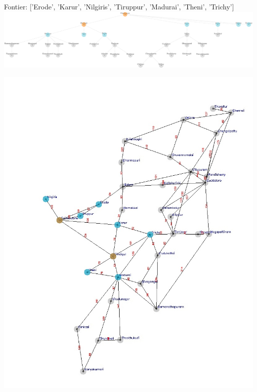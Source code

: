 \documentclass[xcolor=table]{beamer}
\begin{document}
\begin{frame}
  { \tiny Fontier: ['Erode', 'Karur', 'Nilgiris', 'Tiruppur', 'Madurai', 'Theni', 'Trichy'] }
  \includegraphics[width=1\textwidth]{../BFSNodes/4-1.png}
  \begin{center}
    \includegraphics[height=0.6\textheight]{../BFSoutput/tamilBFS2.jpg}
  \end{center}
\end{frame}
\end{document}
